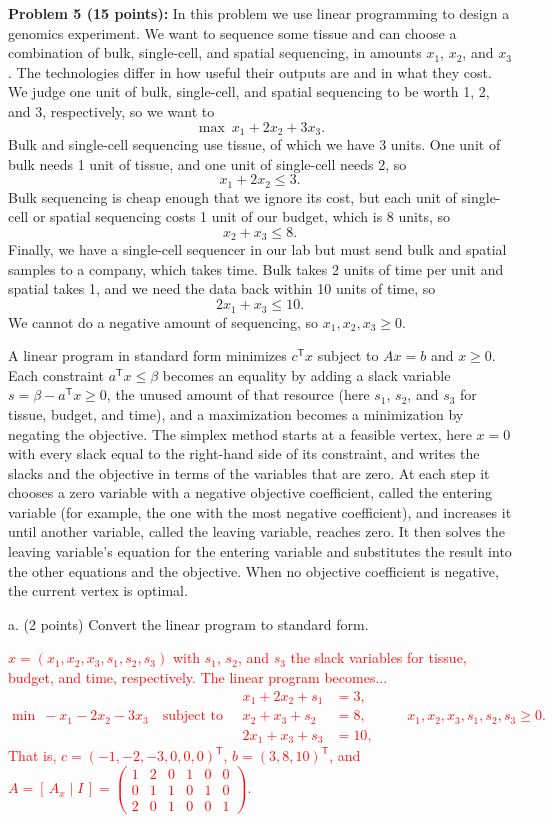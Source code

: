 \documentclass[11pt]{article}
\newcommand{\T}{\mathsf T}
\begin{document}
\vspace{0.5em}
{\bf Problem 5 (15 points):} In this problem we use linear programming to design a genomics
experiment. We want to sequence some tissue and can choose a combination of bulk, single-cell,
and spatial sequencing, in amounts $x_1$, $x_2$, and $x_3$. The technologies differ in how
useful their outputs are and in what they cost. We judge one unit of bulk, single-cell, and
spatial sequencing to be worth 1, 2, and 3, respectively, so we want to
\[
\max\ x_1+2x_2+3x_3.
\]
Bulk and single-cell sequencing use tissue, of which we have 3 units. One unit of bulk
needs 1 unit of tissue, and one unit of single-cell needs 2, so
\[
x_1+2x_2\le 3.
\]
Bulk sequencing is cheap enough that we ignore its cost, but each unit of single-cell or spatial
sequencing costs 1 unit of our budget, which is 8 units, so
\[
x_2+x_3\le 8.
\]
Finally, we have a single-cell sequencer in our lab but must send bulk and spatial samples to a
company, which takes time. Bulk takes 2 units of time per unit and spatial takes 1, and we need
the data back within 10 units of time, so
\[
2x_1+x_3\le 10.
\]
We cannot do a negative amount of sequencing, so $x_1,x_2,x_3\ge0$.

A linear program in standard form minimizes $c^\T x$ subject
to $Ax=b$ and $x\ge0$. Each constraint $a^\T x\le\beta$ becomes an equality by adding a
slack variable $s=\beta-a^\T x\ge0$, the unused amount of that resource (here $s_1$, $s_2$, and $s_3$ for
tissue, budget, and time), and a maximization
becomes a minimization by negating the objective. The simplex method starts at a feasible vertex, here
$x=0$ with every slack equal to the right-hand side of its constraint, and writes the slacks and the objective in terms of
the variables that are zero. At each step it chooses a zero variable with a negative objective
coefficient, called the entering variable (for example, the one with the most negative
coefficient), and increases it until another variable, called the
leaving variable, reaches zero. It then solves the leaving variable's equation for
the entering variable and substitutes the result into the other equations and the objective. When no objective coefficient is negative, the current vertex is optimal.

a. (2 points) Convert the linear program to standard form.

\textcolor{red}{
$x = (x_1, x_2, x_3, s_1, s_2, s_3)$ with $s_1$, $s_2$, and $s_3$ the slack variables for tissue, budget, and time, respectively. The linear program becomes...
\[
\min\ -x_1 - 2x_2 - 3x_3 \quad \text{subject to} \quad
\begin{aligned}
x_1 + 2x_2 + s_1 &= 3, \\
x_2 + x_3 + s_2 &= 8, \\
2x_1 + x_3 + s_3 &= 10,
\end{aligned}
\qquad x_1, x_2, x_3, s_1, s_2, s_3 \ge 0.
\]
That is, $c = (-1, -2, -3, 0, 0, 0)^\T$, $b = (3, 8, 10)^\T$, and
$A = [\,A_x \mid I\,] = \left(\begin{array}{ccc|ccc} 1&2&0&1&0&0\\ 0&1&1&0&1&0\\ 2&0&1&0&0&1 \end{array}\right)$.
}
\end{document}
